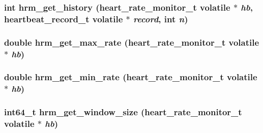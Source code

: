 \hypertarget{heart__rate__monitor-file_8c_9e7614bee97e7db3cb4e7e4b78c94337}{
\subsubsection[hrm\_\-get\_\-history]{\setlength{\rightskip}{0pt plus 5cm}int hrm\_\-get\_\-history ({\bf heart\_\-rate\_\-monitor\_\-t} volatile $\ast$ {\em hb}, \/  {\bf heartbeat\_\-record\_\-t} volatile $\ast$ {\em record}, \/  int {\em n})}}
\label{heart__rate__monitor-file_8c_9e7614bee97e7db3cb4e7e4b78c94337}


\hypertarget{heart__rate__monitor-file_8c_f7f779cd6a79780479064da8b6eb05e7}{
\subsubsection[hrm\_\-get\_\-max\_\-rate]{\setlength{\rightskip}{0pt plus 5cm}double hrm\_\-get\_\-max\_\-rate ({\bf heart\_\-rate\_\-monitor\_\-t} volatile $\ast$ {\em hb})}}
\label{heart__rate__monitor-file_8c_f7f779cd6a79780479064da8b6eb05e7}


\hypertarget{heart__rate__monitor-file_8c_d0ea463faa51e1bf20b3f5efbc4c91c3}{
\subsubsection[hrm\_\-get\_\-min\_\-rate]{\setlength{\rightskip}{0pt plus 5cm}double hrm\_\-get\_\-min\_\-rate ({\bf heart\_\-rate\_\-monitor\_\-t} volatile $\ast$ {\em hb})}}
\label{heart__rate__monitor-file_8c_d0ea463faa51e1bf20b3f5efbc4c91c3}


\hypertarget{heart__rate__monitor-file_8c_1249c1ba65c775d2701de15b4415fded}{
\subsubsection[hrm\_\-get\_\-window\_\-size]{\setlength{\rightskip}{0pt plus 5cm}int64\_\-t hrm\_\-get\_\-window\_\-size ({\bf heart\_\-rate\_\-monitor\_\-t} volatile $\ast$ {\em hb})}}
\label{heart__rate__monitor-file_8c_1249c1ba65c775d2701de15b4415fded}


